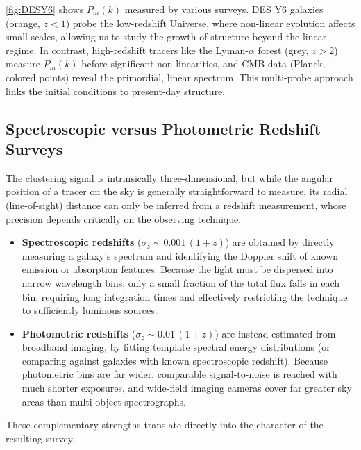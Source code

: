 \medskip

\cref{fig:DESY6} shows $P_m(k)$ measured by various surveys. DES Y6 galaxies (orange, $z<1$) probe the low-redshift Universe, where non-linear evolution affects small scales, allowing us to study the growth of structure beyond the linear regime. In contrast, high-redshift tracers like the Lyman-$\alpha$ forest (grey, $z>2$) measure $P_m(k)$ before significant non-linearities, and CMB data (Planck, colored points) reveal the primordial, linear spectrum. This multi-probe approach links the initial conditions to present-day structure.

\subsection{Spectroscopic versus Photometric Redshift Surveys} \label{subsec:surveys_specphot}

The clustering signal is intrinsically three-dimensional, but while the angular position of a tracer on the sky is generally straightforward to measure, its radial (line-of-sight) distance can only be inferred from a redshift measurement, whose precision depends critically on the observing technique.

\medskip

\begin{itemize}
\item \textbf{Spectroscopic redshifts} ($\sigma_z \sim 0.001\,(1+z)$) are obtained by directly measuring a galaxy's spectrum and identifying the Doppler shift of known emission or absorption features. Because the light must be dispersed into narrow wavelength bins, only a small fraction of the total flux falls in each bin, requiring long integration times and effectively restricting the technique to sufficiently luminous sources.
\item \textbf{Photometric redshifts} ($\sigma_z \sim 0.01\,(1+z)$) are instead estimated from broadband imaging, by fitting template spectral energy distributions (or comparing against galaxies with known spectroscopic redshift). Because photometric bins are far wider, comparable signal-to-noise is reached with much shorter exposures, and wide-field imaging cameras cover far greater sky areas than multi-object spectrographs.
\end{itemize}

\medskip

These complementary strengths translate directly into the character of the resulting survey.

\medskip

